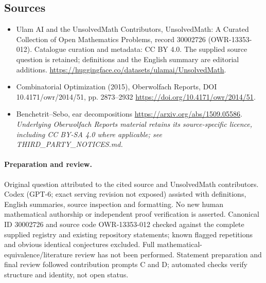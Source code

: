 \documentclass[11pt]{article}
\begin{document}
\subsection{Sources}
\begin{itemize}
\item[\hypertarget{source:30002726:1}{S1}] Ulam AI and the UnsolvedMath Contributors, UnsolvedMath: A Curated Collection of Open Mathematics Problems, record 30002726 (OWR-13353-012). Catalogue curation and metadata: CC BY 4.0. The supplied source question is retained; definitions and the English summary are editorial additions.
\url{https://huggingface.co/datasets/ulamai/UnsolvedMath}.
\item[\hypertarget{source:30002726:2}{S2}] Combinatorial Optimization (2015), Oberwolfach Reports, DOI 10.4171/owr/2014/51, pp. 2873--2932
\url{https://doi.org/10.4171/owr/2014/51}.
\item[\hypertarget{source:30002726:3}{S3}] Benchetrit--Sebo, ear decompositions
\url{https://arxiv.org/abs/1509.05586}.
\textit{Underlying Oberwolfach Reports material retains its source-specific licence, including CC BY-SA 4.0 where applicable; see THIRD\_PARTY\_NOTICES.md.}
\end{itemize}
\paragraph{Preparation and review.}
Original question attributed to the cited source and UnsolvedMath contributors. Codex (GPT-6; exact serving revision not exposed) assisted with definitions, English summaries, source inspection and formatting. No new human mathematical authorship or independent proof verification is asserted. Canonical ID 30002726 and source code OWR-13353-012 checked against the complete supplied registry and existing repository statements; known flagged repetitions and obvious identical conjectures excluded. Full mathematical-equivalence/literature review has not been performed. Statement preparation and final review followed contribution prompts C and D; automated checks verify structure and identity, not open status.
\label{end:30002726}
\end{document}

